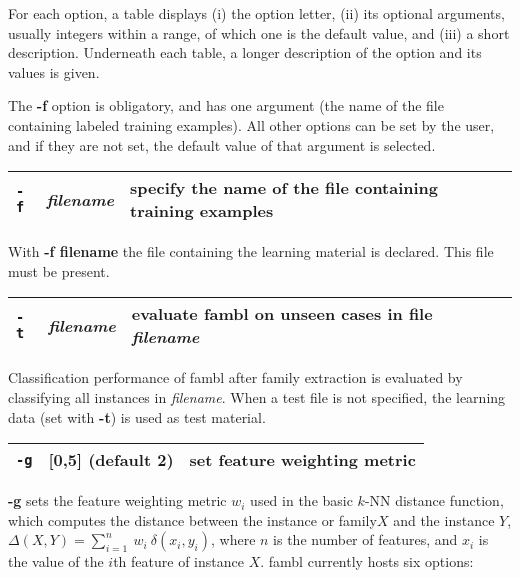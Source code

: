 \documentclass[11pt]{article}
\begin{document}
For each option, a table displays (i) the option letter, (ii) its
optional arguments, usually integers within a range, of which
one is the default value, and (iii) a short description. Underneath each
table, a longer description of the option and its values is given.

The {\bf -f} option is obligatory, and has one argument (the name of
the file containing labeled training examples). All other options can
be set by the user, and if they are not set, the default value of that
argument is selected.  \ \\


\begin{tabular}{|p{}|p{}|p{}|}
\hline
{\tt -f} & {\sl filename} & specify the name of the file containing training examples \\
\hline
\end{tabular}

With {\bf -f filename} the file containing the learning material is
declared. This file must be present. \ \\

\begin{tabular}{|p{}|p{}|p{}|}
\hline
{\tt -t} & {\sl filename} & evaluate {\sc fambl} on unseen cases in file {\sl filename} \\
\hline
\end{tabular}

Classification performance of {\sc fambl} after family extraction is
evaluated by classifying all instances in {\sl filename}. When a test
file is not specified, the learning data (set with {\bf -t}) is used
as test material.  \ \\

\begin{tabular}{|p{}|p{}|p{}|}
\hline
{\tt -g} & [0,5] (default 2) & set feature weighting metric \\
\hline
\end{tabular}

{\bf -g} sets the feature weighting metric $w_{i}$ used in the basic
$k$-NN distance function, which computes the distance between the
instance or family$X$ and the instance $Y$, $\Delta(X,Y) =
\sum_{i=1}^{n}\ w_{i}\ \delta(x_{i},y_{i})$, where $n$ is the number
of features, and $x_{i}$ is the value of the $i$th feature of instance
$X$. {\sc fambl} currently hosts six options:
\end{document}
